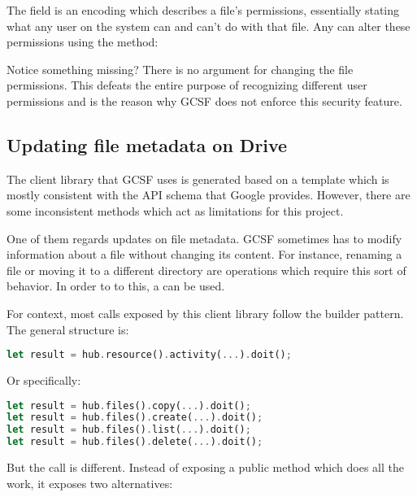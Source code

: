 

The  field is an encoding which describes a file's permissions, essentially stating what any user on the system can and can't do with that file. Any  can alter these permissions using the  method:




Notice something missing? There is no argument for changing the file permissions. This defeats the entire purpose of recognizing different user permissions and is the reason why GCSF does not enforce this security feature.

\subsection{Updating file metadata on Drive} \label{updating_metadata}

The client library that GCSF uses is generated based on a template which is mostly consistent with the API schema that Google provides. However, there are some inconsistent methods which act as limitations for this project.

One of them regards updates on file metadata. GCSF sometimes has to modify information about a file without changing its content. For instance, renaming a file or moving it to a different directory are operations which require this sort of behavior. In order to to this, a  can be used.

For context, most calls exposed by this client library follow the builder pattern\cite{gof}. The general structure is:

\begin{lstlisting}[language=Rust, frame=single]
let result = hub.resource().activity(...).doit();
\end{lstlisting}

Or specifically:

\begin{lstlisting}[language=Rust, frame=single]
let result = hub.files().copy(...).doit();
let result = hub.files().create(...).doit();
let result = hub.files().list(...).doit();
let result = hub.files().delete(...).doit();
\end{lstlisting}

But the  call is different. Instead of exposing a public  method which does all the work, it exposes two alternatives:

